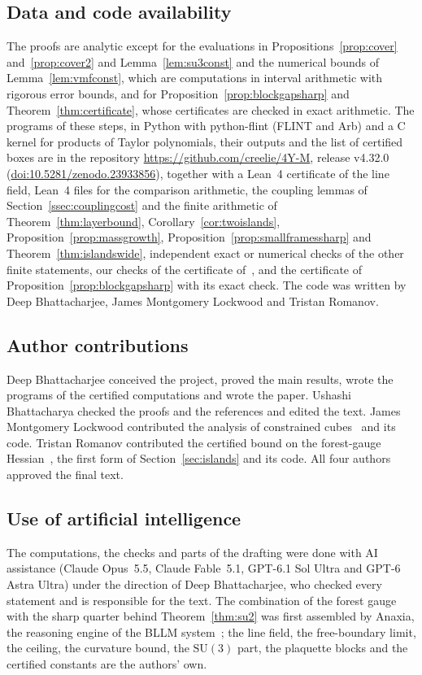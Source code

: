 \documentclass[11pt]{amsart}
\theoremstyle{definition}
\theoremstyle{remark}
\numberwithin{equation}{section}
\newcommand{\SU}{\mathrm{SU}}
\begin{document}
\subsection*{Data and code availability}
The proofs are analytic except for the evaluations in
Propositions~\ref{prop:cover} and~\ref{prop:cover2} and
Lemma~\ref{lem:su3const} and the numerical bounds of
Lemma~\ref{lem:vmfconst}, which are computations in interval arithmetic with
rigorous error bounds, and for Proposition~\ref{prop:blockgapsharp} and
Theorem~\ref{thm:certificate}, whose certificates are checked in exact
arithmetic. The programs of these steps, in Python with
python-flint (FLINT and Arb) and a C kernel for products of Taylor
polynomials, their outputs and the list of certified boxes are in the
repository \url{https://github.com/creelie/4Y-M}, release v4.32.0
(\href{https://doi.org/10.5281/zenodo.23933856}{doi:10.5281/zenodo.23933856}), together
with a Lean~4 certificate of the line field, Lean~4 files for the
comparison arithmetic, the coupling lemmas of
Section~\ref{ssec:couplingcost} and the finite arithmetic of Theorem~\ref{thm:layerbound},
Corollary~\ref{cor:twoislands}, Proposition~\ref{prop:massgrowth}, Proposition~\ref{prop:smallframessharp} and Theorem~\ref{thm:islandswide}, independent exact or
numerical checks of the other finite statements, our checks of the
certificate of~\cite{Rom26}, and the certificate of
Proposition~\ref{prop:blockgapsharp} with its exact check. The code was
written by Deep Bhattacharjee, James Montgomery Lockwood and Tristan
Romanov.

\subsection*{Author contributions}
Deep Bhattacharjee conceived the project, proved the main results, wrote
the programs of the certified computations and wrote the paper. Ushashi
Bhattacharya checked the proofs and the references and edited the text.
James Montgomery Lockwood contributed the analysis of constrained
cubes~\cite{Loc26} and its code. Tristan Romanov contributed the certified
bound on the forest-gauge Hessian~\cite{Rom26}, the first form of
Section~\ref{sec:islands} and its code. All four authors approved the final
text.

\subsection*{Use of artificial intelligence}
The computations, the checks and parts of the drafting were done with AI
assistance (Claude Opus~5.5, Claude Fable~5.1, GPT-6.1 Sol Ultra and GPT-6
Astra Ultra) under the direction of Deep Bhattacharjee, who checked every
statement and is responsible for the text. The combination of the forest
gauge with the sharp quarter behind Theorem~\ref{thm:su2} was first
assembled by Anaxia, the reasoning engine of the BLLM
system~\cite{Bha26,Bha26b}; the line field, the free-boundary limit, the
ceiling, the curvature bound, the $\SU(3)$ part, the plaquette blocks and
the certified constants are the authors' own.
\end{document}
